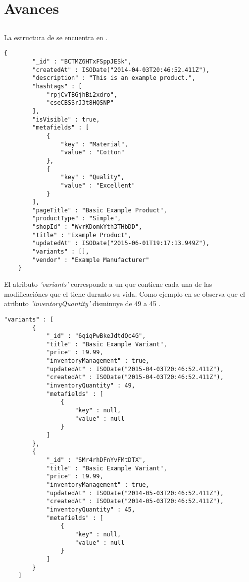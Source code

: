 \chapter{ Avances \dataModelAS }\label{ap:avance_data_model}

\section{\itemcollection}

La estructura de \itemcollection se encuentra en .

\medskip
\begin{lstlisting}[caption= \dataModelAS de \itemcollection, label=source:javascript:data_model_item]
	{
	    "_id" : "BCTMZ6HTxFSppJESk",
	    "createdAt" : ISODate("2014-04-03T20:46:52.411Z"),
	    "description" : "This is an example product.",
	    "hashtags" : [ 
	        "rpjCvTBGjhBi2xdro", 
	        "cseCBSSrJ3t8HQSNP"
	    ],
	    "isVisible" : true,
	    "metafields" : [ 
	        {
	            "key" : "Material",
	            "value" : "Cotton"
	        }, 
	        {
	            "key" : "Quality",
	            "value" : "Excellent"
	        }
	    ],
	    "pageTitle" : "Basic Example Product",
	    "productType" : "Simple",
	    "shopId" : "WvrKDomkYth3THbDD",
	    "title" : "Example Product",
	    "updatedAt" : ISODate("2015-06-01T19:17:13.949Z"),
	    "variants" : [],
	    "vendor" : "Example Manufacturer"
	}
\end{lstlisting}

El atributo \textit{'variants'} corresponde a un \arrayPL que contiene cada una de las modificaciónes que el \itemCOM tiene duranto su vida. Como ejemplo en  se observa que el atributo \textit{'inventoryQuantity'} disminuye de 49 a 45 \itemsCOM.

\medskip
\begin{lstlisting}[caption= El \arrayPL "variants", label=source:javascript:data_model_item_variant]
	 "variants" : [ 
        {
            "_id" : "6qiqPwBkeJdtdQc4G",
            "title" : "Basic Example Variant",
            "price" : 19.99,
            "inventoryManagement" : true,
            "updatedAt" : ISODate("2015-04-03T20:46:52.411Z"),
            "createdAt" : ISODate("2015-04-03T20:46:52.411Z"),
            "inventoryQuantity" : 49,
            "metafields" : [ 
                {
                    "key" : null,
                    "value" : null
                }
            ]
        }, 
        {
            "_id" : "SMr4rhDFnYvFMtDTX",
            "title" : "Basic Example Variant",
            "price" : 19.99,
            "inventoryManagement" : true,
            "updatedAt" : ISODate("2014-05-03T20:46:52.411Z"),
            "createdAt" : ISODate("2014-05-03T20:46:52.411Z"),
            "inventoryQuantity" : 45,
            "metafields" : [ 
                {
                    "key" : null,
                    "value" : null
                }
            ]
        }
    ]
\end{lstlisting}



